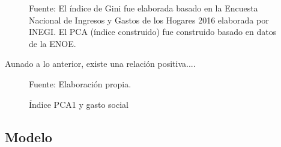 \documentclass[11pt]{article}
\begin{document}
\begin{figure}[H]
\begin{subfigure}{.5\textwidth}
\end{subfigure}
\begin{tiny}
\begin{spacing}{0}
\noindent Fuente: El índice de Gini fue elaborada basado en la Encuesta Nacional de Ingresos y Gastos de los Hogares 2016 elaborada por INEGI. El PCA (índice construido) fue construido basado en datos de la ENOE.
\end{spacing}
\end{tiny}
\end{figure}
%
Aunado a lo anterior, existe una relación positiva....

\begin{figure}[H]
\caption{Índice PCA1 y gasto social}
\begin{center}
\end{center}
\begin{tiny}
\begin{spacing}{0}
\noindent \phantom{aaaaaaaaaaaaaaaaaaaaaaaaaaaa} Fuente: Elaboración propia.
\end{spacing}
\end{tiny}
\end{figure}




\subsection{Modelo}
	
\end{document}
